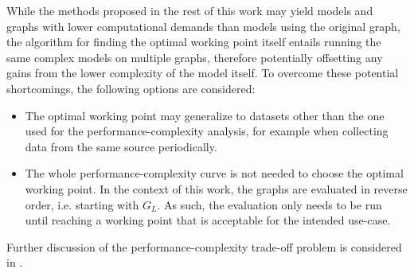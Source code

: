 While the methods proposed in the rest of this work may yield models and graphs with lower computational demands than models using the original graph, the algorithm for finding the optimal working point itself entails running the same complex models on multiple graphs, therefore potentially offsetting any gains from the lower complexity of the model itself. To overcome these potential shortcomings, the following options are considered:
\begin{itemize}
  \item The optimal working point may generalize to datasets other than the one used for the performance-complexity analysis, for example when collecting data from the same source periodically.
  \item The whole performance-complexity curve is not needed to choose the optimal working point. In the context of this work, the graphs are evaluated in reverse order, i.e. starting with \( G_L \). As such, the evaluation only needs to be run until reaching a working point that is acceptable for the intended use-case.
\end{itemize}
Further discussion of the performance-complexity trade-off problem is considered in \cite{prochazka_downstream_2022}.
